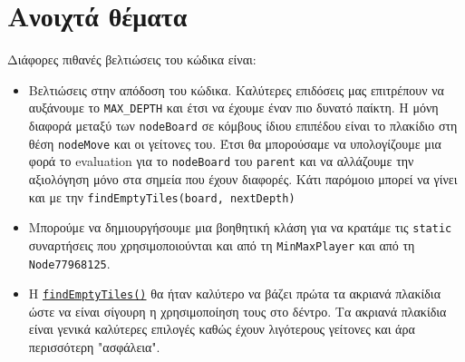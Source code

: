 \chapter{Ανοιχτά θέματα}
Διάφορες πιθανές βελτιώσεις του κώδικα είναι:
\begin{itemize}
    \item Βελτιώσεις στην απόδοση του κώδικα.
    Καλύτερες επιδόσεις μας επιτρέπουν να αυξάνουμε το \lstinline!MAX_DEPTH! και έτσι να έχουμε έναν πιο δυνατό παίκτη.
    Η μόνη διαφορά μεταξύ των \lstinline!nodeBoard! σε κόμβους ίδιου επιπέδου είναι το πλακίδιο στη θέση \lstinline!nodeMove! και οι γείτονες του.
    Έτσι θα μπορούσαμε να υπολογίζουμε μια φορά το evaluation για το \lstinline!nodeBoard! του \lstinline!parent! και να αλλάζουμε την αξιολόγηση μόνο στα σημεία που έχουν διαφορές.
    Κάτι παρόμοιο μπορεί να γίνει και με την \lstinline!findEmptyTiles(board, nextDepth)!

    \item Μπορούμε να δημιουργήσουμε μια βοηθητική κλάση για να κρατάμε τις \lstinline!static! συναρτήσεις που χρησιμοποιούνται και από τη \lstinline!MinMaxPlayer! και από τη \lstinline!Node77968125!.

    \item Η
    \hyperref[fun:findEmptyTiles]{\lstinline!findEmptyTiles()!}
    θα ήταν καλύτερο να βάζει πρώτα τα ακριανά πλακίδια ώστε να είναι σίγουρη η χρησιμοποίηση τους στο δέντρο.
    Τα ακριανά πλακίδια είναι γενικά καλύτερες επιλογές καθώς έχουν λιγότερους γείτονες και άρα περισσότερη "ασφάλεια".
\end{itemize}
